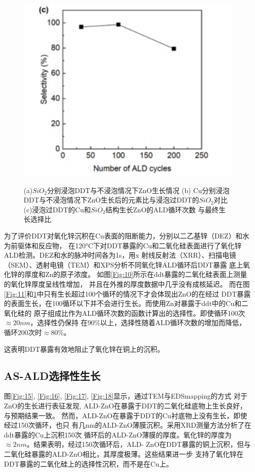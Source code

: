 \documentclass[UTF8,a4paper,12pt]{ctexart}%
\begin{document}
\begin{figure}[htb]
\begin{minipage}[t]{0.3\textwidth}
	\includegraphics[width=1\textwidth]{12.jpg}
	\label{Fig:12}
	\end{minipage}
	\caption{(a)$SiO_2$分别浸泡DDT与不浸泡情况下ZnO生长情况 (b)
	Cu分别浸泡DDT与不浸泡情况下ZnO生长后的元素比与浸泡过DDT的$SiO_2$对比 (c)浸泡过DDT的Cu和$SiO_2$结构生长ZnO的ALD循环次数
	与最终生长选择比}
\end{figure}


为了评价DDT对氧化锌沉积在Cu表面的阻断能力，分别以二乙基锌（DEZ）和水为前驱体和反应物，
在120°C下对DDT暴露的Cu和二氧化硅表面进行了氧化锌ALD检测。DEZ和水的脉冲时间各为1s，用x
射线反射法（XRR）、扫描电镜（SEM）、透射电镜（TEM）和XPS分析不同氧化锌ALD循环后DDT暴露
底上氧化锌的厚度和Zn的原子浓度。
如图\ref{Fig:10}所示在ddt暴露的二氧化硅表面上测量的氧化锌厚度呈线性增加，
并且在外推的厚度数据中几乎没有成核延迟。
而在图\ref{Fig:11}和\ref{Fig:12}中只有生长超过100个循环的情况下才会体现出ZnO的在经过
DDT暴露的表面生长，在100循环以下并不会进行生长。而使用Zn对暴露于ddt中的Cu和二氧化硅的
原子组成比作为ALD循环次数的函数计算出的选择性。即使循环100次$\approx 20nm$，选择性仍保持
在90\%以上，选择性随着ALD循环次数的增加而降低，循环200次时$\approx 80\%$。

这表明DDT暴露有效地阻止了氧化锌在铜上的沉积。


\subsection{AS-ALD选择性生长}

图\ref{Fig:15}, \ref{Fig:16}, \ref{Fig:17}, \ref{Fig:18}显示，通过TEM与EDSmapping的方式
对于ZnO的生长进行表征发现,
ALD-ZnO在暴露于DDT的二氧化硅底物上生长良好，与预期结果一致。
然而，ALD-ZnO在暴露于DDT的Cu衬底物上没有生长，即使经过150次循环，也只
有几nm的ALD-ZnO薄膜沉积。采用XRD测量方法分析了在ddt暴露的Cu上沉积150次
循环后的ALD-ZnO薄膜的厚度。氧化锌的厚度为$\approx 2nm$。结果表明，经过150次循环后，ALD-
ZnO在DDT暴露的铜上沉积，但与二氧化硅暴露的ALD-ZnO相比，其厚度极薄。这些结果进一步
支持了氧化锌在DDT暴露的二氧化硅上的选择性沉积，而不是在Cu上。
\end{document}
